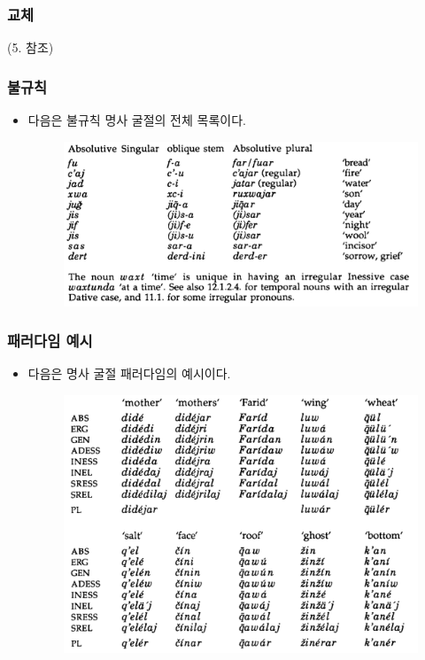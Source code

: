 \subsubsection{교체}
(5. 참조)

\subsubsection{불규칙}
\begin{itemize}
\item 다음은 불규칙 명사 굴절의 전체 목록이다.
\begin{figure}[H]
\centerline{\includegraphics[width=.8\linewidth]{Lezgian/src/ex7-1-4.png}}
\end{figure}
\end{itemize}

\subsubsection{패러다임 예시}
\begin{itemize}
\item 다음은 명사 굴절 패러다임의 예시이다.
\begin{figure}[H]
\centerline{\includegraphics[width=.8\linewidth]{Lezgian/src/ex7-1-5.png}}
\end{figure}
\end{itemize}

